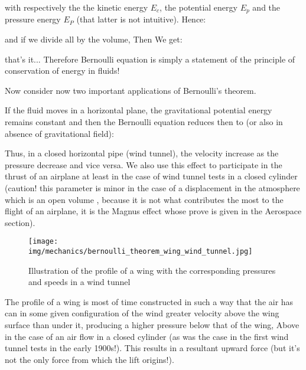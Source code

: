 	with respectively the the kinetic energy $E_c$, the potential energy $E_p$ and the pressure energy $E_P$ (that latter is not intuitive). Hence:
	
	and if we divide all by the volume, Then We get:
	
	that's it... Therefore Bernoulli equation is simply a statement of the principle of conservation of energy in fluids!
	
	Now consider now two important applications of Bernoulli's theorem.

	If the fluid moves in a horizontal plane, the gravitational potential energy remains constant and then the Bernoulli equation reduces then to (or also in absence of gravitational field):
	
	Thus, in a closed horizontal pipe (wind tunnel), the velocity increase as the pressure decrease and vice versa. We also use this effect to participate in the thrust of an airplane at least in the case of wind tunnel tests in a closed cylinder (caution! this parameter is minor in the case of a displacement in the atmosphere which is an open volume , because it is not what contributes the most to the flight of an airplane, it is the Magnus effect  whose prove is given in the Aerospace section).
	\begin{figure}[H]
		\centering
		\texttt{[image: img/mechanics/bernoulli\_theorem\_wing\_wind\_tunnel.jpg]}
		\caption{Illustration of the profile of a wing with the corresponding pressures and speeds in a wind tunnel}
	\end{figure}
	The profile of a wing is most of time constructed in such a way that the air has can in some given configuration of the wind greater velocity above the wing surface than under it, producing a higher pressure below that of the wing, Above in the case of an air flow in a closed cylinder (as was the case in the first wind tunnel tests in the early 1900s!). This results in a resultant upward force (but it's not the only force from which the lift origins!).


